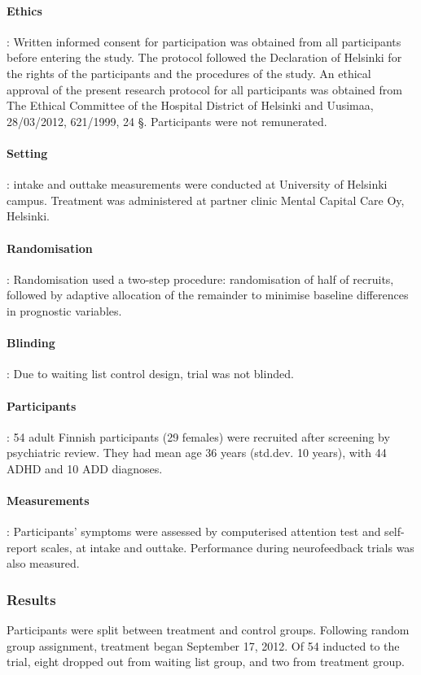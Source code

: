 \paragraph{Ethics}: Written informed consent for participation was obtained from all participants before entering the study. The protocol followed the Declaration of Helsinki for the rights of the participants and the procedures of the study. An ethical approval of the present research protocol for all participants was obtained from The Ethical Committee of the Hospital District of Helsinki and Uusimaa, 28/03/2012, 621/1999, 24 §. Participants were not remunerated.

\paragraph{Setting}: intake and outtake measurements were conducted at University of Helsinki campus. Treatment was administered at partner clinic Mental Capital Care Oy, Helsinki.

\paragraph{Randomisation}: Randomisation used a two-step procedure: randomisation of half of recruits, followed by adaptive allocation of the remainder to minimise baseline differences in prognostic variables.

\paragraph{Blinding}: Due to waiting list control design, trial was not blinded.

\paragraph{Participants}: 54 adult Finnish participants (29 females) were recruited after screening by psychiatric review. They had mean age 36 years (std.dev. 10 years), with 44 ADHD and 10 ADD diagnoses.

\paragraph{Measurements}: Participants’ symptoms were assessed by computerised attention test and self-report scales, at intake and outtake. Performance during neurofeedback trials was also measured.


\subsubsection{Results}
Participants were split between treatment and control groups. Following random group assignment, treatment began September 17, 2012. Of 54 inducted to the trial, eight dropped out from waiting list group, and two from treatment group.

